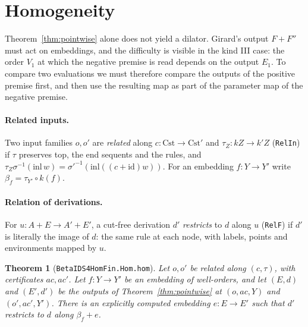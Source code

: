 \documentclass[11pt]{article}
\newtheorem{theorem}{Theorem}[section]
\theoremstyle{remark}
\newcommand{\id}{\mathrm{id}}
\newcommand{\Cst}{\mathrm{Cst}}
\renewcommand{\tt}[1]{\texttt{#1}}
\begin{document}
\section{Homogeneity}

Theorem~\ref{thm:pointwise} alone does not yield a dilator. Girard's
output $F+F''$ must act on embeddings, and the difficulty is visible in the
kind III case: the order $V_1$ at which the negative premise is read
depends on the output $E_1$. To compare two evaluations we must therefore
compare the outputs of the positive premise first, and then use the
resulting map as part of the parameter map of the negative premise.

\paragraph{Related inputs.} Two input families $o,o'$ are \emph{related}
along $c:\Cst\to\Cst'$ and $\tau_Z:kZ\to k'Z$ (\tt{RelIn}) if $\tau$
preserves top, the end sequents and the rules, and
$\tau_Z\sigma^{-1}(\mathrm{inl}\,w)=\sigma'^{-1}(\mathrm{inl}((c+\id)w))$.
For an embedding $f:Y\to Y'$ write $\beta_f=\tau_{Y'}\circ k(f)$.

\paragraph{Relation of derivations.} For $u:A+E\to A'+E'$, a cut-free
derivation $d'$ \emph{restricts} to $d$ along $u$ (\tt{RelF}) if $d'$ is
literally the image of $d$: the same rule at each node, with labels,
points and environments mapped by $u$.

\begin{theorem}[\tt{BetaIDS4HomFin.Hom.hom}]\label{thm:hom}
Let $o,o'$ be related along $(c,\tau)$, with certificates $ac,ac'$. Let
$f:Y\to Y'$ be an embedding of well-orders, and let $(E,d)$ and $(E',d')$
be the outputs of Theorem~\ref{thm:pointwise} at $(o,ac,Y)$ and
$(o',ac',Y')$. There is an explicitly computed embedding $e:E\to E'$ such
that $d'$ restricts to $d$ along $\beta_f+e$.
\end{theorem}
\end{document}
